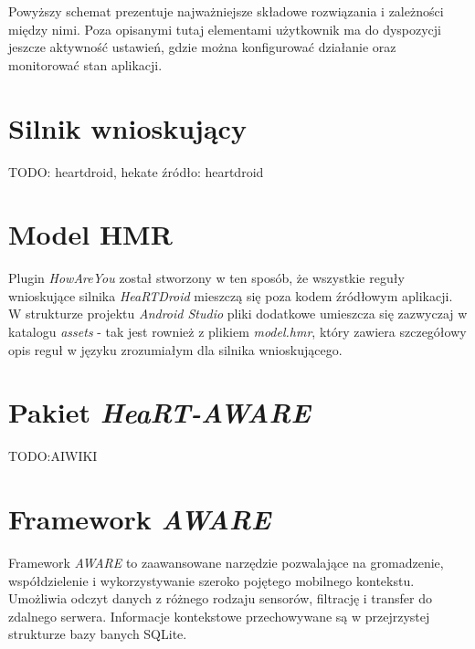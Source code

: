 Powyższy schemat prezentuje najważniejsze składowe rozwiązania i zależności między nimi. Poza opisanymi tutaj elementami użytkownik ma do dyspozycji jeszcze aktywność ustawień, gdzie można konfigurować działanie oraz monitorować stan aplikacji.



\section{Silnik wnioskujący}
\label{sec:silnikWnioskujacy}

TODO: heartdroid, hekate
źródło: heartdroid


\section{Model HMR}
\label{sec:modelHmr}

Plugin \textit{HowAreYou} został stworzony w ten sposób, że wszystkie reguły wnioskujące silnika \textit{HeaRTDroid} mieszczą się poza kodem źródłowym aplikacji. W strukturze projektu \textit{Android Studio} pliki dodatkowe umieszcza się zazwyczaj w katalogu \textit{assets} - tak jest rownież z plikiem \textit{model.hmr}, który zawiera szczegółowy opis reguł w języku zrozumiałym dla silnika wnioskującego.



\section{Pakiet \textit{HeaRT-AWARE}}
\label{sec:pakietHeartAware}

TODO:AIWIKI %


\section{Framework \textit{AWARE}}
\label{sec:frameworkAware}

Framework \textit{AWARE} to zaawansowane narzędzie pozwalające na gromadzenie, współdzielenie i wykorzystywanie szeroko pojętego mobilnego kontekstu. Umożliwia odczyt danych z różnego rodzaju sensorów, filtrację i transfer do zdalnego serwera. Informacje kontekstowe przechowywane są w przejrzystej strukturze bazy banych SQLite. 

